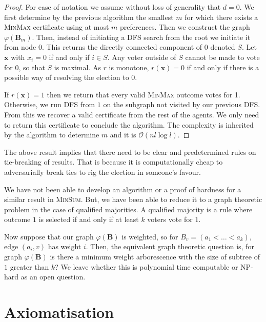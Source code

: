 \documentclass[11pt,a4paper, titlepage]{article}
\theoremstyle{definition}
\let\vec\mathbf
\begin{document}
\begin{proof}

    For ease of notation we assume without loss of generality that $d = 0$.
    We first determine by the previous algorithm the smallest $m$ for which there exists a \textsc{MinMax} certificate using at most $m$ preferences.
    Then we construct the graph $\varphi(\vec{B}_m)$.
    Then, instead of initiating a DFS search from the root we initiate it from node $0$.
    This returns the directly connected component of $0$ denoted $S$.
    Let $\vec{x}$ with $x_i = 0$ if and only if $i \in S$.
    Any voter outside of $S$  cannot be made to vote for $0$, so that $S$ is maximal. As $r$ is monotone, $r(\vec{x}) = 0$ if and only if  there is a possible way of resolving the election to $0$.

    If $r(\vec{x}) = 1$ then we return that every valid \textsc{MinMax} outcome votes for 1.
    Otherwise, we run DFS from $1$ on the subgraph not visited by our previous DFS.
    From this we recover a valid certificate from the rest of the agents.
    We only need to return this certificate to conclude the algorithm.
    The complexity is inherited by the algorithm to determine $m$ and it is $\mathcal{O}(nl \log l)$.
\end{proof}

The above result implies that there need to be clear and predetermined rules on tie-breaking of results.
That is because it is computationally cheap to adversarially break ties to rig the election in someone's favour.

We have not been able to develop an algorithm or a proof of hardness for a similar result in \textsc{MinSum}.
But, we have been able to reduce it to a graph theoretic problem in the case of qualified majorities.
A qualified majority is a rule where outcome $1$ is selected if and only if at least $k$ voters vote for $1$.

Now suppose that our graph $\varphi(\vec{B})$ is weighted, so for $B_v = (a_1 < \ldots < a_k)$, edge $(a_i, v)$ has weight $i$. 
Then, the equivalent graph theoretic question is, for graph $\varphi(\vec{B})$ is there a minimum weight arborescence with the size of subtree of $1$ greater than $k$? 
We leave whether this is polynomial time computable or NP-hard as an open question.

\newpage
\section{Axiomatisation}
\label{section:axioms}
\end{document}

